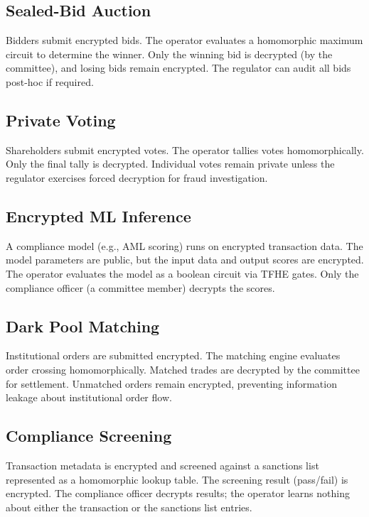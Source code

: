 \documentclass[11pt,a4paper]{article}
\begin{document}
\subsection{Sealed-Bid Auction}

Bidders submit encrypted bids.  The operator evaluates a homomorphic
maximum circuit to determine the winner.  Only the winning bid is
decrypted (by the committee), and losing bids remain encrypted.
The regulator can audit all bids post-hoc if required.

\subsection{Private Voting}

Shareholders submit encrypted votes.  The operator tallies votes
homomorphically.  Only the final tally is decrypted.  Individual votes
remain private unless the regulator exercises forced decryption for
fraud investigation.

\subsection{Encrypted ML Inference}

A compliance model (e.g., AML scoring) runs on encrypted transaction
data.  The model parameters are public, but the input data and output
scores are encrypted.  The operator evaluates the model as a boolean
circuit via TFHE gates.  Only the compliance officer (a committee
member) decrypts the scores.

\subsection{Dark Pool Matching}

Institutional orders are submitted encrypted.  The matching engine
evaluates order crossing homomorphically.  Matched trades are decrypted
by the committee for settlement.  Unmatched orders remain encrypted,
preventing information leakage about institutional order flow.

\subsection{Compliance Screening}

Transaction metadata is encrypted and screened against a sanctions list
represented as a homomorphic lookup table.  The screening result
(pass/fail) is encrypted.  The compliance officer decrypts results; the
operator learns nothing about either the transaction or the sanctions
list entries.
\end{document}
